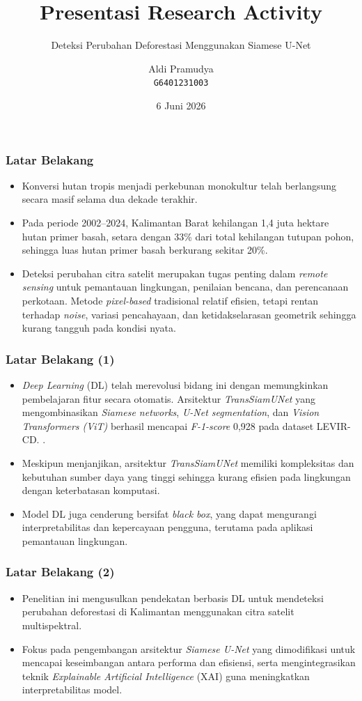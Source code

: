 \documentclass{beamer}
\title[]
{Presentasi Research Activity}
\subtitle{Deteksi Perubahan Deforestasi Menggunakan Siamese U-Net}
\author[Aldi Pramudya]
{Aldi Pramudya \\ \texttt{G6401231003}}
\institute[IPB]
{
	Program Studi Ilmu Komputer \\
	Sekolah Sains dan Matematika (SSMI) \\
	Institut Pertanian Bogor (IPB University)
}
\date{6 Juni 2026}
\begin{document}
	
	\frame{\titlepage}
	
	\begin{frame}
		\frametitle{Latar Belakang}
		\begin{itemize}
		\item Konversi hutan tropis menjadi perkebunan monokultur telah berlangsung secara masif selama dua dekade terakhir.
		
		\item Pada periode 2002--2024, Kalimantan Barat kehilangan 1{,}4 juta hektare hutan primer basah, setara dengan 33\% dari total kehilangan tutupan pohon, sehingga luas hutan primer basah berkurang sekitar 20\%. 
		
		\item Deteksi perubahan citra satelit merupakan tugas penting dalam \textit{remote sensing} untuk pemantauan lingkungan, penilaian bencana, dan perencanaan perkotaan. Metode \textit{pixel-based} tradisional relatif efisien, tetapi rentan terhadap \textit{noise}, variasi pencahayaan, dan ketidakselarasan geometrik sehingga kurang tangguh pada kondisi nyata.  
		\end{itemize}
	\end{frame}

	\begin{frame}
		\frametitle{Latar Belakang (1)}
		\begin{itemize}
		\item \textit{Deep Learning} (DL) telah merevolusi bidang ini dengan memungkinkan pembelajaran fitur secara otomatis. Arsitektur \textit{TransSiamUNet} yang mengombinasikan \textit{Siamese networks}, \textit{U-Net segmentation}, dan \textit{Vision Transformers (ViT)} berhasil mencapai \textit{F-1-score} 0,928 pada dataset LEVIR-CD. \footfullcite{Ali2026}.
		\item Meskipun menjanjikan, arsitektur \textit{TransSiamUNet} memiliki kompleksitas dan kebutuhan sumber daya yang tinggi sehingga kurang efisien pada lingkungan dengan keterbatasan komputasi.
    
		\item Model DL juga cenderung bersifat \textit{black box}, yang dapat mengurangi interpretabilitas dan kepercayaan pengguna, terutama pada aplikasi pemantauan lingkungan.
		\end{itemize}
	\end{frame}
	
	\begin{frame}
		\frametitle{Latar Belakang (2)}
		\begin{itemize}
		\item Penelitian ini mengusulkan pendekatan berbasis DL untuk mendeteksi perubahan deforestasi di Kalimantan menggunakan citra satelit multispektral.
		
		\item Fokus pada pengembangan arsitektur \textit{Siamese U-Net} yang dimodifikasi untuk mencapai keseimbangan antara performa dan efisiensi, serta mengintegrasikan teknik \textit{Explainable Artificial Intelligence} (XAI) guna meningkatkan interpretabilitas model.
		\end{itemize}
	\end{frame}
	
\end{document}
